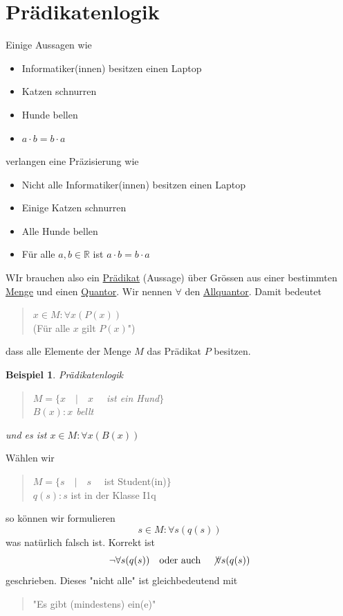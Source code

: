 \documentclass{report}
\newtheorem{myexample}{Beispiel}
\begin{document}
\section{Prädikatenlogik}
Einige Aussagen wie
\begin{itemize}
\item Informatiker(innen) besitzen einen Laptop
\item Katzen schnurren
\item Hunde bellen
\item $a \cdot b = b \cdot a$\end{itemize}
verlangen eine Präzisierung wie
\begin{itemize}
\item Nicht alle Informatiker(innen) besitzen einen Laptop
\item Einige Katzen schnurren
\item Alle Hunde bellen
\item Für alle $a,b \in \mathbb{R}$ ist $a \cdot b = b \cdot a$\end{itemize}
WIr brauchen also ein \underline{Prädikat} (Aussage) über Grössen aus einer bestimmten \underline{Menge} und einen \underline{Quantor}.
Wir nennen $\forall$ den \underline{Allquantor}. Damit bedeutet
\begin{quote}$x \in M: \forall x (P(x))$\\
(Für alle $x$ gilt $P(x)$")\end{quote}
dass alle Elemente der Menge $M$ das Prädikat $P$ besitzen.
\begin{myexample}Prädikatenlogik
\begin{quote}$M = \{x \quad|\quad x \quad$ ist ein Hund$\}$ \\
$B(x) : x$ bellt\end{quote}
und es ist $x \in M : \forall x (B(x))$\end{myexample}
Wählen wir
\begin{quote}$M = \{s \quad|\quad s \quad$ ist Student(in)$\}$ \\
$q(s): s$ ist in der Klasse I1q\end{quote}
so können wir formulieren
\begin{equation}s \in M : \forall s (q(s))\end{equation}
was natürlich falsch ist. Korrekt ist
\begin{equation}\lnot \forall s (q(s)) \quad \mbox{oder auch} \quad \not \forall s(q(s))\end{equation}
geschrieben. Dieses "nicht alle" ist gleichbedeutend mit
\begin{quote}"Es gibt (mindestens) ein(e)"\end{quote}
\end{document}
